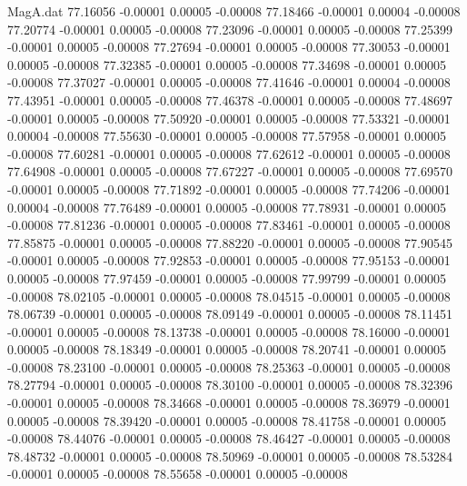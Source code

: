 \begin{filecontents}{MagA.dat}
  77.16056   -0.00001    0.00005   -0.00008
  77.18466   -0.00001    0.00004   -0.00008
  77.20774   -0.00001    0.00005   -0.00008
  77.23096   -0.00001    0.00005   -0.00008
  77.25399   -0.00001    0.00005   -0.00008
  77.27694   -0.00001    0.00005   -0.00008
  77.30053   -0.00001    0.00005   -0.00008
  77.32385   -0.00001    0.00005   -0.00008
  77.34698   -0.00001    0.00005   -0.00008
  77.37027   -0.00001    0.00005   -0.00008
  77.41646   -0.00001    0.00004   -0.00008
  77.43951   -0.00001    0.00005   -0.00008
  77.46378   -0.00001    0.00005   -0.00008
  77.48697   -0.00001    0.00005   -0.00008
  77.50920   -0.00001    0.00005   -0.00008
  77.53321   -0.00001    0.00004   -0.00008
  77.55630   -0.00001    0.00005   -0.00008
  77.57958   -0.00001    0.00005   -0.00008
  77.60281   -0.00001    0.00005   -0.00008
  77.62612   -0.00001    0.00005   -0.00008
  77.64908   -0.00001    0.00005   -0.00008
  77.67227   -0.00001    0.00005   -0.00008
  77.69570   -0.00001    0.00005   -0.00008
  77.71892   -0.00001    0.00005   -0.00008
  77.74206   -0.00001    0.00004   -0.00008
  77.76489   -0.00001    0.00005   -0.00008
  77.78931   -0.00001    0.00005   -0.00008
  77.81236   -0.00001    0.00005   -0.00008
  77.83461   -0.00001    0.00005   -0.00008
  77.85875   -0.00001    0.00005   -0.00008
  77.88220   -0.00001    0.00005   -0.00008
  77.90545   -0.00001    0.00005   -0.00008
  77.92853   -0.00001    0.00005   -0.00008
  77.95153   -0.00001    0.00005   -0.00008
  77.97459   -0.00001    0.00005   -0.00008
  77.99799   -0.00001    0.00005   -0.00008
  78.02105   -0.00001    0.00005   -0.00008
  78.04515   -0.00001    0.00005   -0.00008
  78.06739   -0.00001    0.00005   -0.00008
  78.09149   -0.00001    0.00005   -0.00008
  78.11451   -0.00001    0.00005   -0.00008
  78.13738   -0.00001    0.00005   -0.00008
  78.16000   -0.00001    0.00005   -0.00008
  78.18349   -0.00001    0.00005   -0.00008
  78.20741   -0.00001    0.00005   -0.00008
  78.23100   -0.00001    0.00005   -0.00008
  78.25363   -0.00001    0.00005   -0.00008
  78.27794   -0.00001    0.00005   -0.00008
  78.30100   -0.00001    0.00005   -0.00008
  78.32396   -0.00001    0.00005   -0.00008
  78.34668   -0.00001    0.00005   -0.00008
  78.36979   -0.00001    0.00005   -0.00008
  78.39420   -0.00001    0.00005   -0.00008
  78.41758   -0.00001    0.00005   -0.00008
  78.44076   -0.00001    0.00005   -0.00008
  78.46427   -0.00001    0.00005   -0.00008
  78.48732   -0.00001    0.00005   -0.00008
  78.50969   -0.00001    0.00005   -0.00008
  78.53284   -0.00001    0.00005   -0.00008
  78.55658   -0.00001    0.00005   -0.00008

\end{filecontents}

